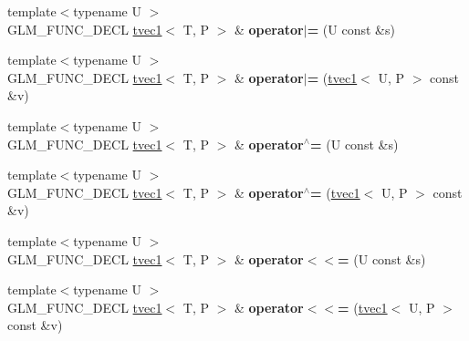 \begin{DoxyCompactItemize}
\item 
{\footnotesize template$<$typename U $>$ }\\G\+L\+M\+\_\+\+F\+U\+N\+C\+\_\+\+D\+E\+CL \hyperlink{structglm_1_1detail_1_1tvec1}{tvec1}$<$ T, P $>$ \& {\bfseries operator$\vert$=} (U const \&s)\hypertarget{structglm_1_1detail_1_1tvec1_a879683e788198a53a1c4661a1b5af383}{}\label{structglm_1_1detail_1_1tvec1_a879683e788198a53a1c4661a1b5af383}

\item 
{\footnotesize template$<$typename U $>$ }\\G\+L\+M\+\_\+\+F\+U\+N\+C\+\_\+\+D\+E\+CL \hyperlink{structglm_1_1detail_1_1tvec1}{tvec1}$<$ T, P $>$ \& {\bfseries operator$\vert$=} (\hyperlink{structglm_1_1detail_1_1tvec1}{tvec1}$<$ U, P $>$ const \&v)\hypertarget{structglm_1_1detail_1_1tvec1_a15ea891a329d3a5149263d7a9fb81b40}{}\label{structglm_1_1detail_1_1tvec1_a15ea891a329d3a5149263d7a9fb81b40}

\item 
{\footnotesize template$<$typename U $>$ }\\G\+L\+M\+\_\+\+F\+U\+N\+C\+\_\+\+D\+E\+CL \hyperlink{structglm_1_1detail_1_1tvec1}{tvec1}$<$ T, P $>$ \& {\bfseries operator$^\wedge$=} (U const \&s)\hypertarget{structglm_1_1detail_1_1tvec1_ae48766d1c02e2946f6185eaac15737ef}{}\label{structglm_1_1detail_1_1tvec1_ae48766d1c02e2946f6185eaac15737ef}

\item 
{\footnotesize template$<$typename U $>$ }\\G\+L\+M\+\_\+\+F\+U\+N\+C\+\_\+\+D\+E\+CL \hyperlink{structglm_1_1detail_1_1tvec1}{tvec1}$<$ T, P $>$ \& {\bfseries operator$^\wedge$=} (\hyperlink{structglm_1_1detail_1_1tvec1}{tvec1}$<$ U, P $>$ const \&v)\hypertarget{structglm_1_1detail_1_1tvec1_a03d26aae5b039d37df678fe8648efbb8}{}\label{structglm_1_1detail_1_1tvec1_a03d26aae5b039d37df678fe8648efbb8}

\item 
{\footnotesize template$<$typename U $>$ }\\G\+L\+M\+\_\+\+F\+U\+N\+C\+\_\+\+D\+E\+CL \hyperlink{structglm_1_1detail_1_1tvec1}{tvec1}$<$ T, P $>$ \& {\bfseries operator$<$$<$=} (U const \&s)\hypertarget{structglm_1_1detail_1_1tvec1_a52cec716d59902c6a42eeebd28f78de9}{}\label{structglm_1_1detail_1_1tvec1_a52cec716d59902c6a42eeebd28f78de9}

\item 
{\footnotesize template$<$typename U $>$ }\\G\+L\+M\+\_\+\+F\+U\+N\+C\+\_\+\+D\+E\+CL \hyperlink{structglm_1_1detail_1_1tvec1}{tvec1}$<$ T, P $>$ \& {\bfseries operator$<$$<$=} (\hyperlink{structglm_1_1detail_1_1tvec1}{tvec1}$<$ U, P $>$ const \&v)\hypertarget{structglm_1_1detail_1_1tvec1_a12d03301e51ece6466714a8203f8b237}{}\label{structglm_1_1detail_1_1tvec1_a12d03301e51ece6466714a8203f8b237}


\end{DoxyCompactItemize}
